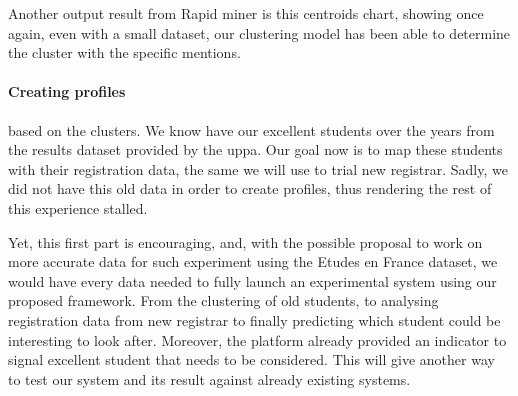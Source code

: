 \documentclass[../main.tex]{subfiles}
\begin{document}
Another output result from Rapid miner is this centroids chart, showing once again, even with a small dataset, our clustering model has been able to determine the cluster with the specific mentions.

\paragraph{Creating profiles} based on the clusters. We know have our excellent students over the years from the results dataset provided by the \acrshort{uppa}. Our goal now is to map these students with their registration data, the same we will use to trial new registrar. Sadly, we did not have this old data in order to create profiles, thus rendering the rest of this experience stalled. 

Yet, this first part is encouraging, and, with the possible proposal to work on more accurate data for such experiment using the Etudes en France dataset, we would have every data needed to fully launch an experimental system using our proposed framework. From the clustering of old students, to analysing registration data from new registrar to finally predicting which student could be interesting to look after. Moreover, the platform already provided an indicator to signal excellent student that needs to be considered. This will give another way to test our system and its result against already existing systems. 
\end{document}
